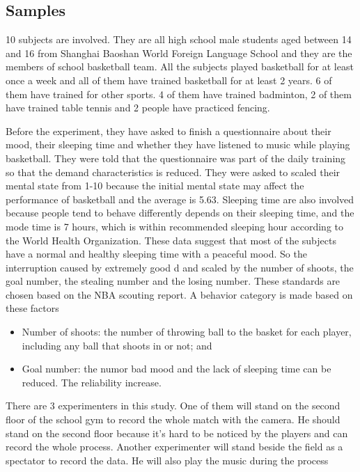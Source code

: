 \documentclass[man,floatsintext]{apa7}
\begin{document}
\subsection{Samples}
10 subjects are involved. They are all high school male students aged between 14 and 16 from Shanghai Baoshan World Foreign Language School and they are the members of school basketball team. All the subjects played basketball for at least once a week and all of them have trained basketball for at least 2 years. 6 of them have trained for other sports. 4 of them have trained badminton, 2 of them have trained table tennis and 2 people have practiced fencing. 

Before the experiment, they have asked to finish a questionnaire about their mood, their sleeping time and whether they have listened to music while playing basketball. They were told that the questionnaire was part of the daily training so that the demand characteristics is reduced. They were asked to scaled their mental state from 1-10 because the initial mental state may affect the performance of basketball \autocite{liuMoodStatusResponse2023} and the average is 5.63. Sleeping time are also involved because people tend to behave differently depends on their sleeping time, and the mode time is 7 hours, which is within recommended sleeping hour according to the World Health Organization. These data suggest that most of the subjects have a normal and healthy sleeping time with a peaceful mood. So the interruption caused by extremely good d and scaled by the number of
shoots, the goal number, the stealing number and the losing number. These
standards are chosen based on the NBA scouting report.\autocite{NBAZhongGuoGuanFangWangZhanQiuYuanZiLiao2024} A behavior category is made based on these factors

\begin{itemize}
\item Number of shoots: the number of throwing ball to the basket for each player, including any ball that shoots in or not; and
\item Goal number: the numor bad mood and the lack of sleeping time can be reduced. The reliability increase.
\end{itemize}

There are 3 experimenters in this study. One of them will stand on the second floor of the school gym to record the whole match with the camera. He should stand on the second floor because it's hard to be noticed by the players and can record the whole process. Another experimenter will stand beside the field as a spectator to record the data. He will also play the music during the process
\end{document}
